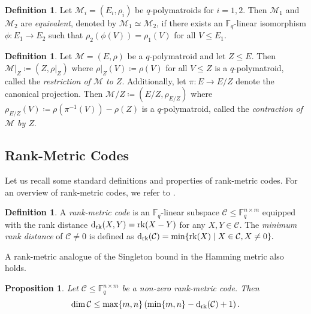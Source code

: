 \documentclass[onecolumn,draftclsnofoot,12pt]{IEEEtran}
\newcommand{\rk}{\mathrm{rk}}
\theoremstyle{plain} %
\newtheorem{proposition}[theorem]{Proposition}
\theoremstyle{definition}
\newtheorem{definition}[theorem]{Definition}
\begin{document}
\begin{definition} \label{def:equivalentmatroids}
Let $\mathcal{M}_i = (E_i, \rho_i)$ be $q$-polymatroids for $i=1,2$. Then $\mathcal{M}_1$ and $\mathcal{M}_2$ are \textit{equivalent}, denoted by $\mathcal{M}_1 \simeq \mathcal{M}_2$, if there exists an $\mathbb{F}_q$-linear isomorphism $\phi \colon E_1 \rightarrow E_2$ such that $\rho_2(\phi(V)) = \rho_1(V)$ for all $V\leq E_1$. 
\end{definition}

\begin{definition} Let $\mathcal{M} = (E,\rho)$ be a $q$-polymatroid and let $Z\leq E$. Then $\mathcal{M}|_Z \coloneqq (Z,\rho|_{Z})$ where $\rho|_{Z}(V) \coloneqq \rho(V)$ for all $V\leq Z$ is a $q$-polymatroid, called the \textit{restriction of $\mathcal{M}$ to $Z$}. Additionally, let $\pi\colon E\rightarrow E/Z$ denote the canonical projection. Then $\mathcal{M}/Z \coloneqq (E/Z,\rho_{E/Z})$ where $\rho_{E/Z}(V) \coloneqq \rho(\pi^{-1}(V))-\rho(Z)$ is a $q$-polymatroid, called the \textit{contraction of $\mathcal{M}$ by $Z$}.
\end{definition}

\subsection{Rank-Metric Codes}

Let us recall some standard definitions and properties of rank-metric codes. For an overview of rank-metric codes, we refer to \cite{bartz2022rankmetriccodesapplications}. 

\begin{definition}
    A \emph{rank-metric code} is an $\mathbb{F}_q$-linear subspace $\mathcal{C} \leq \mathbb{F}_q^{n \times m}$ equipped with the rank distance $\textup{d}_{\rk}(X, Y) = \mathrm{rk}(X - Y)$
    for any $X, Y \in \mathcal{C}$. The \textit{minimum rank distance} of $\mathcal{C} \neq 0$ is defined as $
    \textup{d}_{\rk}(\mathcal{C}) = \min \{ \mathrm{rk}(X) \mid X \in \mathcal{C}, X \neq 0 \}.$
\end{definition}

A rank-metric analogue of the Singleton bound in the Hamming metric also holds.

\begin{proposition} \label{thm:singleton}
    Let $\mathcal{C} \leq \mathbb{F}_q^{n \times m}$ be a non-zero rank-metric code. Then
    $$
    \dim \mathcal{C} \leq \max\{m, n\} \left( \min\{m, n\} - \textup{d}_{\rk}(\mathcal{C}) + 1 \right).$$
\end{proposition}
\end{document}
